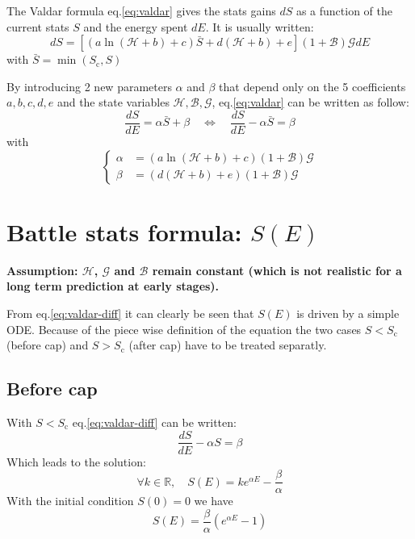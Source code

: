 \documentclass[12pt]{article}
\def\happy{\mathcal{H}}
\def\gym{\mathcal{G}}
\def\bonus{\mathcal{B}}
\def\Sc{S_\text{c}}
\begin{document}
The Valdar formula eq.\eqref{eq:valdar} gives the stats gains $dS$ as a function of the current stats $S$ and the energy spent $dE$. It is usually written:
\begin{equation}
    dS = \left[ (a\ln(\happy+b)+c) \bar{S} + d(\happy+b) + e \right](1+\bonus)\gym dE
    \label{eq:valdar}
\end{equation}
with $\bar{S} = \min(\Sc, S)$

\par By introducing 2 new parameters $\alpha$ and $\beta$ that depend only on the 5 coefficients $a, b, c, d, e$ and the state variables $\happy, \bonus, \gym$, eq.\eqref{eq:valdar} can be written as follow:
\begin{equation}
    \frac{dS}{dE} = \alpha \bar{S} + \beta \quad \Leftrightarrow \quad \frac{dS}{dE} - \alpha \bar{S} = \beta
    \label{eq:valdar-diff}
\end{equation}
with
\begin{equation}
    \left\{\begin{aligned}
        \alpha &= (a\ln(\happy+b)+c)(1+\bonus)\gym\\
        \beta &= (d(\happy+b) +e)(1+\bonus)\gym
    \end{aligned}\right.
\end{equation}

\section{Battle stats formula: $S(E)$}
\par {\color{myred}\bf Assumption: $\happy$, $\gym$ and $\bonus$ remain constant (which is not realistic for a long term prediction at early stages).}

\par From eq.\eqref{eq:valdar-diff} it can clearly be seen that $S(E)$ is driven by a simple ODE. Because of the piece wise definition of the equation the two cases $S<\Sc$ (before cap) and $S>\Sc$ (after cap) have to be treated separatly.

\subsection{Before cap}
With $S<\Sc$ eq.\eqref{eq:valdar-diff} can be written:
\begin{equation}
    \frac{dS}{dE} -\alpha S = \beta
\end{equation}
Which leads to the solution:
\begin{equation}
    \forall k \in \mathbb{R},\quad S(E) = ke^{\alpha E} - \frac{\beta}{\alpha}
    \label{eq:bs-bc-diff-k}
\end{equation}
With the initial condition $S(0)=0$ we have
\begin{equation}
    S(E) = \frac{\beta}{\alpha}\left(e^{\alpha E} - 1\right)
    \label{eq:bs-bc-diff}
\end{equation}
\end{document}
